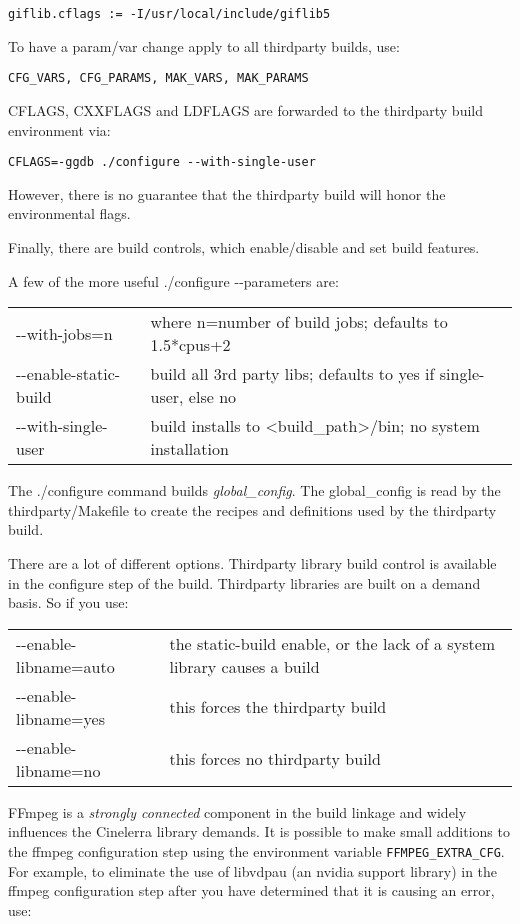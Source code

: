 \hspace{2em}\texttt{giflib.cflags := -I/usr/local/include/giflib5}

To have a param/var change apply to all thirdparty builds, use:

\hspace{2em}\texttt{CFG\_VARS, CFG\_PARAMS, MAK\_VARS, MAK\_PARAMS}

CFLAGS, CXXFLAGS and LDFLAGS are forwarded to the thirdparty build environment via:

\hspace{2em}\texttt{CFLAGS=-ggdb ./configure -{}-with-single-user}

However, there is no guarantee that the thirdparty build will honor the environmental flags.

Finally, there are build controls, which enable/disable and set build features.

A few of the more useful ./configure -{}-parameters are:

\begin{tabular}{ll}
	-{}-with-jobs=n & where n=number of build jobs; defaults to 1.5*cpus+2\\
	-{}-enable-static-build & build all 3rd party libs; defaults to yes if single-user, else no\\
	-{}-with-single-user& build installs to <build\_path>/bin; no system installation\\
\end{tabular}


The ./configure command builds \textit{global\_config}. The global\_config is read by the thirdparty/Makefile to create the recipes and definitions used by the thirdparty build.

There are a lot of different options.  Thirdparty library build control is available in the configure step of the build.  Thirdparty libraries are built on a demand basis.  So if you use:

\begin{tabular}{l p{11cm}}
  -{}-enable-libname=auto & the static-build enable, or the lack of a system library causes a build\\
  -{}-enable-libname=yes  &  this forces the thirdparty build\\
  -{}-enable-libname=no   &  this forces no thirdparty build\\
\end{tabular}

FFmpeg is a \textit{strongly connected} component in the build linkage and widely influences the Cinelerra library demands.  It is possible to make small additions to the ffmpeg configuration step using the environment variable \texttt{FFMPEG\_EXTRA\_CFG}.  For example, to eliminate the use of libvdpau (an nvidia support library) in the ffmpeg configuration step after you have determined that it is causing an error, use:


